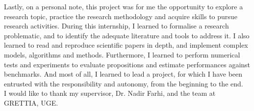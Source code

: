 Lastly, on a personal note, this project was for me the opportunity to explore a research topic, practice the research methodology and acquire skills to pursue research activities.
During this internship, I learned to formalise a research problematic, and to identify the adequate literature and tools to address it. I also learned to read and reproduce scientific papers in depth, and implement complex models, algorithms and methods. Furthermore, I learned to perform numerical tests and experiments to evaluate propositions and estimate performances against benchmarks. And most of all, I learned to lead a project, for which I have been entrusted with the responsibility and autonomy, from the beginning to the end. \\

I would like to thank my supervisor, Dr. Nadir Farhi, and the team at GRETTIA, UGE.

\pagebreak
